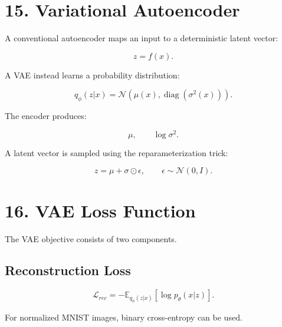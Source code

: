 \documentclass[10pt]{article}
\begin{document}
\section*{15. Variational Autoencoder}

A conventional autoencoder maps an input to a deterministic latent vector:

\[
z=f(x).
\]

A VAE instead learns a probability distribution:

\[
q_{\phi}(z|x)
=
\mathcal{N}
\left(
\mu(x),
\operatorname{diag}(\sigma^2(x))
\right).
\]

The encoder produces:

\[
\mu,\qquad \log\sigma^2.
\]

A latent vector is sampled using the reparameterization trick:

\[
z=\mu+\sigma\odot\epsilon,
\qquad
\epsilon\sim\mathcal{N}(0,I).
\]

\begin{center}
\end{center}

\section*{16. VAE Loss Function}

The VAE objective consists of two components.

\subsection*{Reconstruction Loss}

\[
\mathcal{L}_{rec}
=
-\mathbb{E}_{q_{\phi}(z|x)}
[\log p_{\theta}(x|z)].
\]

For normalized MNIST images, binary cross-entropy can be used.
\end{document}
